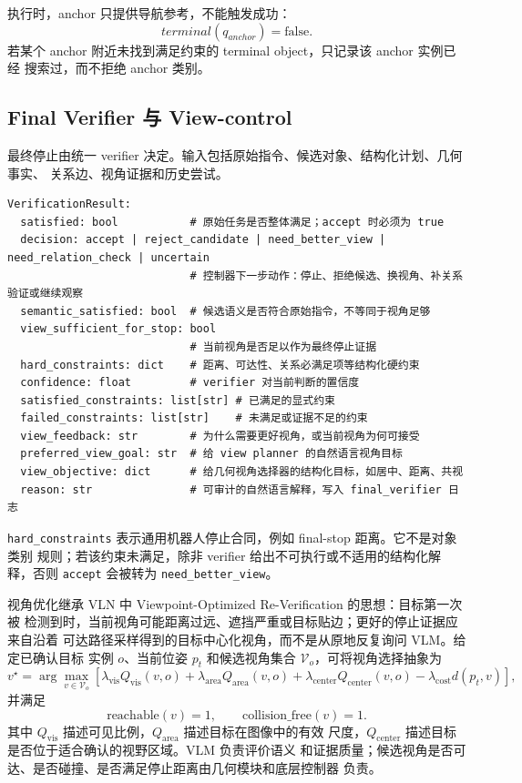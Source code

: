 \documentclass[UTF8,zihao=-4]{ctexart}
\begin{document}
执行时，anchor 只提供导航参考，不能触发成功：
\begin{equation}
  terminal(q_{anchor}) = \mathrm{false}.
\end{equation}
若某个 anchor 附近未找到满足约束的 terminal object，只记录该 anchor 实例已经
搜索过，而不拒绝 anchor 类别。

\subsection{Final Verifier 与 View-control}

最终停止由统一 verifier 决定。输入包括原始指令、候选对象、结构化计划、几何事实、
关系边、视角证据和历史尝试。

\begin{lstlisting}[style=pseudo,caption={VerificationResult 的核心字段}]
VerificationResult:
  satisfied: bool           # 原始任务是否整体满足；accept 时必须为 true
  decision: accept | reject_candidate | need_better_view | need_relation_check | uncertain
                            # 控制器下一步动作：停止、拒绝候选、换视角、补关系验证或继续观察
  semantic_satisfied: bool  # 候选语义是否符合原始指令，不等同于视角足够
  view_sufficient_for_stop: bool
                            # 当前视角是否足以作为最终停止证据
  hard_constraints: dict    # 距离、可达性、关系必满足项等结构化硬约束
  confidence: float         # verifier 对当前判断的置信度
  satisfied_constraints: list[str] # 已满足的显式约束
  failed_constraints: list[str]    # 未满足或证据不足的约束
  view_feedback: str        # 为什么需要更好视角，或当前视角为何可接受
  preferred_view_goal: str  # 给 view planner 的自然语言视角目标
  view_objective: dict      # 给几何视角选择器的结构化目标，如居中、距离、共视
  reason: str               # 可审计的自然语言解释，写入 final_verifier 日志
\end{lstlisting}

\texttt{hard\_constraints} 表示通用机器人停止合同，例如 final-stop 距离。它不是对象类别
规则；若该约束未满足，除非 verifier 给出不可执行或不适用的结构化解释，否则
\texttt{accept} 会被转为 \texttt{need\_better\_view}。

视角优化继承 VLN 中 Viewpoint-Optimized Re-Verification 的思想：目标第一次被
检测到时，当前视角可能距离过远、遮挡严重或目标贴边；更好的停止证据应来自沿着
可达路径采样得到的目标中心化视角，而不是从原地反复询问 VLM。给定已确认目标
实例 $o$、当前位姿 $p_t$ 和候选视角集合 $\mathcal{V}_o$，可将视角选择抽象为
\begin{equation}
  v^\star =
  \arg\max_{v\in\mathcal{V}_o}
  \left[
  \lambda_{\mathrm{vis}}Q_{\mathrm{vis}}(v,o)
  +\lambda_{\mathrm{area}}Q_{\mathrm{area}}(v,o)
  +\lambda_{\mathrm{center}}Q_{\mathrm{center}}(v,o)
  -\lambda_{\mathrm{cost}}d(p_t,v)
  \right],
  \label{eq:view_control_objective}
\end{equation}
并满足
\begin{equation}
  \mathrm{reachable}(v)=1,
  \qquad
  \mathrm{collision\_free}(v)=1 .
\end{equation}
其中 $Q_{\mathrm{vis}}$ 描述可见比例，$Q_{\mathrm{area}}$ 描述目标在图像中的有效
尺度，$Q_{\mathrm{center}}$ 描述目标是否位于适合确认的视野区域。VLM 负责评价语义
和证据质量；候选视角是否可达、是否碰撞、是否满足停止距离由几何模块和底层控制器
负责。
\end{document}
